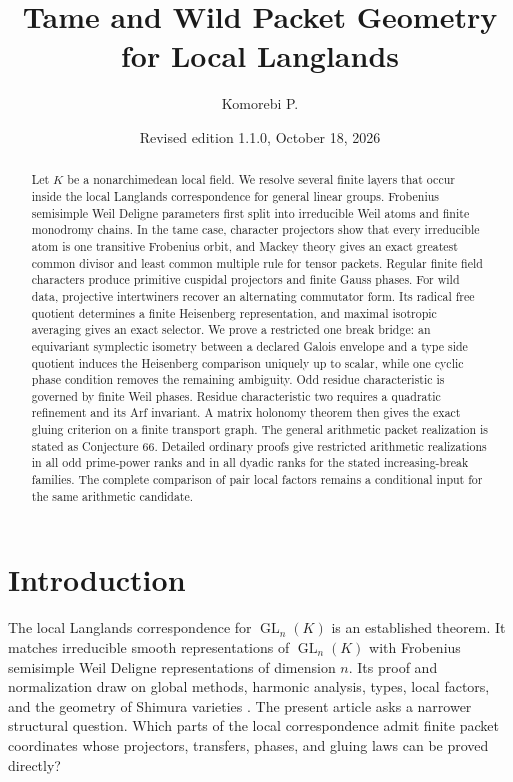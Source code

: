 \documentclass[11pt]{amsart}
\title[Tame and wild packet geometry]{Tame and Wild Packet Geometry for Local Langlands}
\author[Komorebi P.]{Komorebi P.}
\date{Revised edition 1.1.0, October 18, 2026}
\theoremstyle{definition}
\theoremstyle{remark}
\newcommand{\GL}{\operatorname{GL}}
\begin{document}
\KomorebiCover

\begin{abstract}
Let \(K\) be a nonarchimedean local field. We resolve several finite layers that occur inside the local Langlands correspondence for general linear groups. Frobenius semisimple Weil Deligne parameters first split into irreducible Weil atoms and finite monodromy chains. In the tame case, character projectors show that every irreducible atom is one transitive Frobenius orbit, and Mackey theory gives an exact greatest common divisor and least common multiple rule for tensor packets. Regular finite field characters produce primitive cuspidal projectors and finite Gauss phases. For wild data, projective intertwiners recover an alternating commutator form. Its radical free quotient determines a finite Heisenberg representation, and maximal isotropic averaging gives an exact selector. We prove a restricted one break bridge: an equivariant symplectic isometry between a declared Galois envelope and a type side quotient induces the Heisenberg comparison uniquely up to scalar, while one cyclic phase condition removes the remaining ambiguity. Odd residue characteristic is governed by finite Weil phases. Residue characteristic two requires a quadratic refinement and its Arf invariant. A matrix holonomy theorem then gives the exact gluing criterion on a finite transport graph. The general arithmetic packet realization is stated as Conjecture 66. Detailed ordinary proofs give restricted arithmetic realizations in all odd prime-power ranks and in all dyadic ranks for the stated increasing-break families. The complete comparison of pair local factors remains a conditional input for the same arithmetic candidate.
\end{abstract}
\makeatletter\@setabstract\makeatother
\thispagestyle{plain}
\clearpage
\setcounter{tocdepth}{1}
\begingroup\setlength{\parskip}{0pt}
\tableofcontents
\endgroup
\clearpage

\clearpage

\section{Introduction}\label{sec:introduction}

The local Langlands correspondence for \(\GL_n(K)\) is an established theorem. It matches irreducible smooth representations of \(\GL_n(K)\) with Frobenius semisimple Weil Deligne representations of dimension \(n\). Its proof and normalization draw on global methods, harmonic analysis, types, local factors, and the geometry of Shimura varieties \cite{Henniart2000,HarrisTaylor2001,BushnellHenniart2006}. The present article asks a narrower structural question. Which parts of the local correspondence admit finite packet coordinates whose projectors, transfers, phases, and gluing laws can be proved directly?
\end{document}
